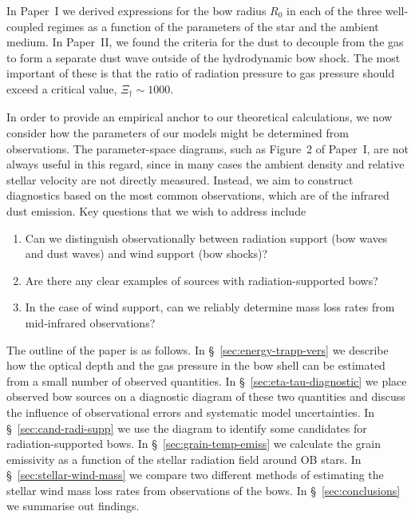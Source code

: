 \documentclass[useAMS, usenatbib, a4paper]{mnras}
\begin{document}
In Paper~I we derived expressions for the bow radius \(R_0\) in each of
the three well-coupled regimes as a function of the parameters of the
star and the ambient medium.  In Paper~II, we found the criteria for
the dust to decouple from the gas to form a separate dust wave outside
of the hydrodynamic bow shock.  The most important of these is that
the ratio of radiation pressure to gas pressure should exceed a
critical value, \(\Xi_\dag \sim 1000\).  

In order to provide an empirical anchor to our theoretical
calculations, we now consider how the parameters of our models might
be determined from observations.  The parameter-space diagrams, such
as Figure~2 of Paper~I, are not always useful in this regard, since in
many cases the ambient density and relative stellar velocity are not
directly measured.  Instead, we aim to construct diagnostics based on
the most common observations, which are of the infrared dust emission.
Key questions that we wish to address include
\begin{enumerate}[1.]
\item Can we distinguish observationally between radiation support
  (bow waves and dust waves) and wind support (bow shocks)?
\item Are there any clear examples of sources with radiation-supported bows?
\item In the case of wind support, can we reliably determine mass loss
  rates from mid-infrared observations?
\end{enumerate}

The outline of the paper is as follows. In
\S~\ref{sec:energy-trapp-vers} we describe how the optical depth and
the gas pressure in the bow shell can be estimated from a small number
of observed quantities.  In \S~\ref{sec:eta-tau-diagnostic} we place
observed bow sources on a diagnostic diagram of these two quantities
and discuss the influence of observational errors and systematic model
uncertainties. In \S~\ref{sec:cand-radi-supp} we use the diagram to
identify some candidates for radiation-supported bows. In
\S~\ref{sec:grain-temp-emiss} we calculate the grain emissivity as a
function of the stellar radiation field around OB stars.  In
\S~\ref{sec:stellar-wind-mass} we compare two different methods of
estimating the stellar wind mass loss rates from observations of the
bows.  In \S~\ref{sec:conclusions} we summarise out findings.


\end{document}
